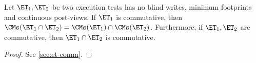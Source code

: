 \begin{theorem}                                                                            
Let $\ET_1, \ET_2$ be two execution tests has no blind writes, minimum footprints and continuous post-views.
If $\ET_1$ is commutative, 
then $\CMs(\ET_1 \cap \ET_2) = \CMs(\ET_1) \cap \CMs(\ET_2)$. 
Furthermore, if $\ET_1, \ET_2$ are commutative, then $\ET_1 \cap \ET_2$ 
is commutative.
\end{theorem}
\begin{proof}
    See \cref{sec:et-comm}.
\end{proof}


%
%

